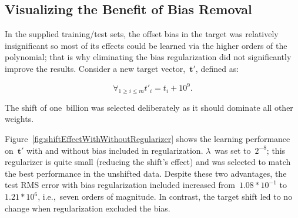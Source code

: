 \documentclass{report}
\begin{document}
  \subsection{Visualizing the Benefit of Bias Removal}
  
  In the supplied training/test sets, the offset bias in the target was relatively insignificant so most of its effects could be learned via the higher orders of the polynomial; that is why eliminating the bias regularization did not significantly improve the results.  Consider a new target vector,~$\mathbf{t}'$, defined as:
  
  \begin{equation}
    \forall_{1 \geq i \leq m} t'_i = t_i + 10^{9}\textrm{.}
  \end{equation}

  \noindent
  The shift of one~billion was selected deliberately as it should dominate all other weights. 
  
  Figure~\ref{fig:shiftEffectWithWithoutRegularizer} shows the learning performance on~$\mathbf{t}'$ with and without bias included in regularization.  $\lambda$~was set to~$2^{-8}$; this regularizer is quite small (reducing the shift's effect) and was selected to match the best performance in the unshifted data.  Despite these two advantages, the test RMS error with bias regularization included increased from~$1.08*10^{-1}$ to~$1.21*10^{6}$, i.e.,~seven orders of magnitude.  In contrast, the target shift led to no change when regularization excluded the bias.
  
\end{document}
